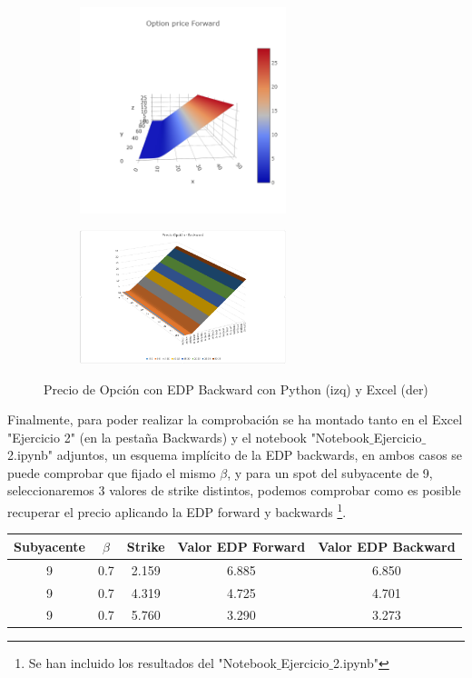 \documentclass[titlepage]{article}
\begin{document}
\begin{figure}[h]
	\begin{subfigure}{7cm}
    	\centering\includegraphics[width=6cm]{PyEDPBackward}
  	\end{subfigure}
  	\begin{subfigure}{7cm}
    	\centering\includegraphics[width=6cm]{ExEDPBackward}
  	\end{subfigure}
  	\caption{Precio de Opción con EDP Backward con Python (izq) y Excel (der)}
  	\label{fig: EDP Backward}
\end{figure}

\vspace{5pt}
Finalmente, para poder realizar la comprobación se ha montado tanto en el Excel "Ejercicio 2" (en la pestaña Backwards) y el notebook "Notebook$\_$Ejercicio$\_$2.ipynb" adjuntos, un esquema implícito de la EDP backwards, en ambos casos se puede comprobar que fijado el mismo $\beta$, y para un spot del subyacente de 9, seleccionaremos 3 valores de strike distintos, podemos comprobar como es posible recuperar el precio aplicando la EDP forward y backwards \footnote{Se han incluido los resultados del "Notebook$\_$Ejercicio$\_$2.ipynb"}.

\begin{center}
	\begin{tabular}{c c c c c}
	\hline
	Subyacente & $\beta$ & Strike & Valor EDP Forward & Valor EDP Backward \\
	\hline 
	9 & 0.7 & 2.159 & 6.885 & 6.850 \\
	9 & 0.7 & 4.319 & 4.725 & 4.701 \\
	9 & 0.7 & 5.760 & 3.290 & 3.273 \\	
	\hline
	\end{tabular}
\end{center} 
\end{document}
